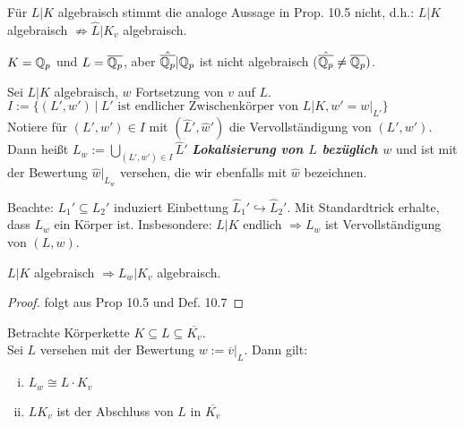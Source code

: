 \begin{Bem}
Für $L|K$ algebraisch stimmt die analoge Aussage in Prop. 10.5 nicht, d.h.: $L|K$ algebraisch $\not \Rightarrow \hat{L} | K_v$ algebraisch.
\end{Bem}

\begin{Bsp*}
$K=\mathbb{Q}_p$ und $L=\overline{\mathbb{Q}_p}$, aber $\hat{\overline{\mathbb{Q}_p}} | \mathbb{Q}_p$ ist nicht algebraisch ($\hat{\overline{\mathbb{Q}_p}} \neq \overline{\mathbb{Q}_p})$.
\end{Bsp*}

\begin{defi}
Sei $L|K$ algebraisch, $w$ Fortsetzung von $v$ auf $L$.\\
$I:=\{(L', w') \ | \ L' \text{ ist endlicher Zwischenkörper von } L|K, w'= w|_{L'} \}$\\
Notiere für $(L', w') \in I$ mit $(\hat{L}',\hat{w}')$ die Vervollständigung von $(L', w')$.\\
Dann heißt $L_w:= \bigcup_{(L',w') \in I} \hat{L}'$ \textbf{\emph{Lokalisierung von $L$ bezüglich $w$}} und ist mit der Bewertung $\hat{w}|_{L_w}$ versehen, die wir ebenfalls mit $\hat{w}$ bezeichnen.\\
\end{defi}

Beachte: $L_1' \subseteq L_2'$ induziert Einbettung $\hat{L}_1' \hookrightarrow \hat{L}_2'$. Mit Standardtrick erhalte, dass $L_w$ ein Körper ist. Insbesondere: $L|K$ endlich $\Rightarrow L_w$ ist Vervollständigung von $(L,w)$.

\begin{Prop}
$L|K$ algebraisch $\Rightarrow L_w | K_v$ algebraisch.
\end{Prop}

\begin{proof}
folgt aus Prop 10.5 und Def. 10.7
\end{proof}

\begin{Prop}
Betrachte Körperkette $K \subseteq L \subseteq \overline{K_v}$.\\
Sei $L$ versehen mit der Bewertung $w:=\overline{v}|_L$. Dann gilt:
\begin{enumerate}[i)]
\item $L_w \cong L \cdot K_v$
\item $L K_v$ ist der Abschluss von $L$ in $\overline{K_v}$
\end{enumerate}
\end{Prop}

